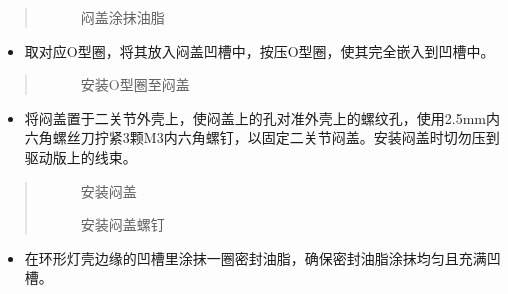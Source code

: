 \documentclass[a4paper,11pt,english,openany,oneside]{sphinxmanual}
\begin{document}
\begin{itemize}
\begin{quote}
\begin{figure}[H]
\centering
\capstart

\noindent{}
\caption{闷盖涂抹油脂}\label{\detokenize{_u66f4_u6362_u5173_u8282:id55}}\end{figure}
\end{quote}
\begin{itemize}
\item {} 
\sphinxAtStartPar
取对应O型圈，将其放入闷盖凹槽中，按压O型圈，使其完全嵌入到凹槽中。

\end{itemize}
\begin{quote}

\begin{figure}[H]
\centering
\capstart

\noindent{}
\caption{安装O型圈至闷盖}\label{\detokenize{_u66f4_u6362_u5173_u8282:id56}}\end{figure}
\end{quote}
\begin{itemize}
\item {} 
\sphinxAtStartPar
将闷盖置于二关节外壳上，使闷盖上的孔对准外壳上的螺纹孔，使用2.5mm内六角螺丝刀拧紧3颗M3内六角螺钉，以固定二关节闷盖。安装闷盖时切勿压到驱动版上的线束。

\end{itemize}
\begin{quote}

\begin{figure}[H]
\centering
\capstart

\noindent{}
\caption{安装闷盖}\label{\detokenize{_u66f4_u6362_u5173_u8282:id57}}\end{figure}

\begin{figure}[H]
\centering
\capstart

\noindent{}
\caption{安装闷盖螺钉}\label{\detokenize{_u66f4_u6362_u5173_u8282:id58}}\end{figure}
\end{quote}
\begin{itemize}
\item {} 
\sphinxAtStartPar
在环形灯壳边缘的凹槽里涂抹一圈密封油脂，确保密封油脂涂抹均匀且充满凹槽。

\end{itemize}
\begin{quote}


\end{quote}
\end{itemize}
\end{document}
